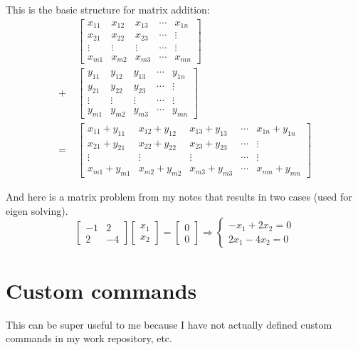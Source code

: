 \documentclass{article} %
\begin{document}
This is the basic structure for matrix addition:
\begin{align*}
    &\begin{bmatrix}
        x_{11} & x_{12} & x_{13} & \cdots & x_{1n}\\
        x_{21} & x_{22} & x_{23} & \cdots & \vdots\\
        \vdots & \vdots & \vdots & \cdots & \vdots\\
        x_{m1} & x_{m2} & x_{m3} & \cdots & x_{mn}
    \end{bmatrix}\\
    +\;&\begin{bmatrix}
        y_{11} & y_{12} & y_{13} & \cdots & y_{1n}\\
        y_{21} & y_{22} & y_{23} & \cdots & \vdots\\
        \vdots & \vdots & \vdots & \cdots & \vdots\\
        y_{m1} & y_{m2} & y_{m3} & \cdots & y_{mn}
    \end{bmatrix}\\
    =\;&\begin{bmatrix}
        x_{11} + y_{11} & x_{12} + y_{12} & x_{13} + y_{13} & \cdots & x_{1n} + y_{1n}\\
        x_{21} + y_{21} & x_{22} + y_{22} & x_{23} + y_{23} & \cdots & \vdots\\
        \vdots & \vdots & \vdots & \cdots & \vdots\\
        x_{m1} + y_{m1} & x_{m2} + y_{m2} & x_{m3} + y_{m3} & \cdots & x_{mn} + y_{mn}
    \end{bmatrix}
\end{align*}

And here is a matrix problem from my notes that results in two cases (used for eigen solving).
\[
    \begin{bmatrix}
        -1 & 2 \\
        2 & -4
    \end{bmatrix}
    \begin{bmatrix}
        x_1 \\ x_2
    \end{bmatrix}
    = 
    \begin{bmatrix}
        0 \\ 0
    \end{bmatrix}
    \Rightarrow
    \begin{cases}
    - x_1 + 2x_2 = 0 \\
    2x_1 - 4x_2 = 0
    \end{cases}
\]
\section{Custom commands}
This can be super useful to me because I have not actually defined custom commands in my work repository, etc.
\end{document}
